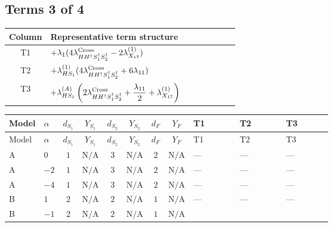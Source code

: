 \documentclass[8pt]{article}
\begin{document}
\begin{landscape}
\subsection*{Terms 3 of 4}
\begin{center}
\begin{tabular}{@{}c >{\raggedright\arraybackslash}p{0.82\linewidth}@{}}
\toprule
Column & Representative term structure \\
\midrule
T1 & \(\displaystyle +{\lambda_1} (4 {\lambda_{H H^\dagger S_1^\dagger S_2^\dagger}^{\rm Cross}}-2 {\lambda_{X_{17}}^{(1)}})\) \\
\midrule
T2 & \(\displaystyle +{\lambda_{HS_1}^{(1)}} (4 {\lambda_{H H^\dagger S_1^\dagger S_2^\dagger}^{\rm Cross}}+6 {\lambda_{11}})\) \\
\midrule
T3 & \(\displaystyle +{\lambda_{HS_1}^{(A)}} \left(2 {\lambda_{H H^\dagger S_1^\dagger S_2^\dagger}^{\rm Cross}}+\frac{{\lambda_{11}}}{2}+{\lambda_{X_{17}}^{(1)}}\right)\) \\
\midrule
\bottomrule
\end{tabular}
\end{center}
\smallskip
\tiny
\begin{longtable}{@{}llcccccc >{\raggedright\arraybackslash}p{0.21\linewidth} >{\raggedright\arraybackslash}p{0.21\linewidth} >{\raggedright\arraybackslash}p{0.21\linewidth}@{}}
\toprule
Model & $\alpha$ & $d_{S_1}$ & $Y_{S_1}$ & $d_{S_2}$ & $Y_{S_2}$ & $d_F$ & $Y_F$ & T1 & T2 & T3 \\
\midrule
\endfirsthead
\toprule
Model & $\alpha$ & $d_{S_1}$ & $Y_{S_1}$ & $d_{S_2}$ & $Y_{S_2}$ & $d_F$ & $Y_F$ & T1 & T2 & T3 \\
\midrule
\endhead
A & $0$ & $1$ & $\text{N/A}$ & $3$ & $\text{N/A}$ & $2$ & $\text{N/A}$ & --- & --- & --- \\
\midrule
A & $-2$ & $1$ & $\text{N/A}$ & $3$ & $\text{N/A}$ & $2$ & $\text{N/A}$ & --- & --- & --- \\
\midrule
A & $-4$ & $1$ & $\text{N/A}$ & $3$ & $\text{N/A}$ & $2$ & $\text{N/A}$ & --- & --- & --- \\
\midrule
B & $1$ & $2$ & $\text{N/A}$ & $2$ & $\text{N/A}$ & $1$ & $\text{N/A}$ & --- & --- & --- \\
\midrule
B & $-1$ & $2$ & $\text{N/A}$ & $2$ & $\text{N/A}$ & $1$ & $\text{N/A}$ & \scriptsize\adjustbox{max width=\linewidth}{$\begin{gathered} +{\lambda_1} (4 {\lambda_{H H^\dagger S_1^\dagger S_2^\dagger}^{\rm Cross}}-2 {\lambda_{X_{17}}^{(1)}})\end{gathered}$} & \scriptsize\adjustbox{max width=\linewidth}{$\begin{gathered} +{\lambda_{HS_1}^{(1)}} (4 {\lambda_{H H^\dagger S_1^\dagger S_2^\dagger}^{\rm Cross}}+6 {\lambda_{11}})\end{gathered}$} & \scriptsize\adjustbox{max width=\linewidth}{$\begin{gathered} +{\lambda_{HS_1}^{(A)}} \left(2 {\lambda_{H H^\dagger S_1^\dagger S_2^\dagger}^{\rm Cross}}+\frac{{\lambda_{11}}}{2}+{\lambda_{X_{17}}^{(1)}}\right)\end{gathered}$} \\

\end{longtable}
\end{landscape}
\end{document}
